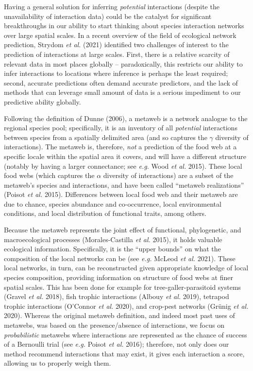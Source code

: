 \documentclass[11pt]{article}
\begin{document}
\clearpage
\linenumbers
\pagestyle{normal}

Having a general solution for inferring \emph{potential} interactions
(despite the unavailability of interaction data) could be the catalyst
for significant breakthroughs in our ability to start thinking about
species interaction networks over large spatial scales. In a recent
overview of the field of ecological network prediction, Strydom \emph{et
al.} (2021) identified two challenges of interest to the prediction of
interactions at large scales. First, there is a relative scarcity of
relevant data in most places globally -- paradoxically, this restricts
our ability to infer interactions to locations where inference is
perhaps the least required; second, accurate predictions often demand
accurate predictors, and the lack of methods that can leverage small
amount of data is a serious impediment to our predictive ability
globally.

Following the definition of Dunne (2006), a metaweb is a network
analogue to the regional species pool; specifically, it is an inventory
of all \emph{potential} interactions between species from a spatially
delimited area (and so captures the \(\gamma\) diversity of
interactions). The metaweb is, therefore, \emph{not} a prediction of the
food web at a specific locale within the spatial area it covers, and
will have a different structure (notably by having a larger connectance;
see \emph{e.g.} Wood \emph{et al.} 2015). These local food webs (which
captures the \(\alpha\) diversity of interactions) are a subset of the
metaweb's species and interactions, and have been called ``metaweb
realizations'' (Poisot \emph{et al.} 2015). Differences between local
food web and their metaweb are due to chance, species abundance and
co-occurrence, local environmental conditions, and local distribution of
functional traits, among others.

Because the metaweb represents the joint effect of functional,
phylogenetic, and macroecological processes (Morales-Castilla \emph{et
al.} 2015), it holds valuable ecological information. Specifically, it
is the ``upper bounds'' on what the composition of the local networks
can be (see \emph{e.g.} McLeod \emph{et al.} 2021). These local
networks, in turn, can be reconstructed given appropriate knowledge of
local species composition, providing information on structure of food
webs at finer spatial scales. This has been done for example for
tree-galler-parasitoid systems (Gravel \emph{et al.} 2018), fish trophic
interactions (Albouy \emph{et al.} 2019), tetrapod trophic interactions
(O'Connor \emph{et al.} 2020), and crop-pest networks (Grünig \emph{et
al.} 2020). Whereas the original metaweb definition, and indeed most
past uses of metawebs, was based on the presence/absence of
interactions, we focus on \emph{probabilistic} metawebs where
interactions are represented as the chance of success of a Bernoulli
trial (see \emph{e.g.} Poisot \emph{et al.} 2016); therefore, not only
does our method recommend interactions that may exist, it gives each
interaction a score, allowing us to properly weigh them.
\end{document}
